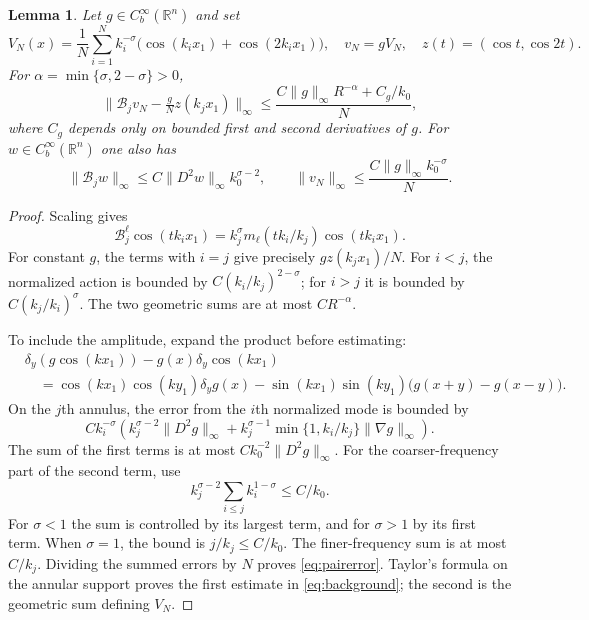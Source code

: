 \documentclass[11pt]{article}
\newcommand{\R}{\mathbb R}
\newcommand{\B}{\mathcal B}
\newcommand{\norm}[1]{\lVert#1\rVert}
\newcommand{\Cb}{C_b^\infty(\R^n)}
\newtheorem{lemma}[theorem]{Lemma}
\theoremstyle{remark}
\numberwithin{equation}{section}
\begin{document}
\begin{lemma}\label{lem:annular}
Let $g\in\Cb$ and set
\[
 V_N(x)=\frac1N\sum_{i=1}^N k_i^{-\sigma}
                  \bigl(\cos(k_ix_1)+\cos(2k_ix_1)\bigr),\quad
 v_N=gV_N,\quad z(t)=(\cos t,\cos 2t).
\]
For $\alpha=\min\{\sigma,2-\sigma\}>0$,
\begin{equation}\label{eq:pairerror}
 \norm{\B_jv_N-\tfrac gN z(k_jx_1)}_\infty
 \le \frac{C\norm g_\infty R^{-\alpha}+C_g/k_0}{N},
\end{equation}
where $C_g$ depends only on bounded first and second derivatives of $g$.
For $w\in\Cb$ one also has
\begin{equation}\label{eq:background}
 \norm{\B_jw}_\infty\le C\norm{D^2w}_\infty k_0^{\sigma-2},
 \qquad
 \norm{v_N}_\infty\le\frac{C\norm g_\infty k_0^{-\sigma}}{N}.
\end{equation}
\end{lemma}
\begin{proof}
Scaling gives
\[
 \B_j^\ell\cos(tk_ix_1)
   =k_j^\sigma m_\ell(tk_i/k_j)\cos(tk_ix_1).
\]
For constant $g$, the terms with $i=j$ give precisely $g z(k_jx_1)/N$.
For $i<j$, the normalized action is bounded by
$C(k_i/k_j)^{2-\sigma}$; for $i>j$ it is bounded by
$C(k_j/k_i)^\sigma$. The two geometric sums are at most $CR^{-\alpha}$.

To include the amplitude, expand the product before estimating:
\begin{align*}
 &\delta_y(g\cos(kx_1))-g(x)\delta_y\cos(kx_1)\\
 &\quad=\cos(kx_1)\cos(ky_1)\delta_yg(x)
 -\sin(kx_1)\sin(ky_1)\bigl(g(x+y)-g(x-y)\bigr).
\end{align*}
On the $j$th annulus, the error from the $i$th normalized mode is bounded by
\begin{equation}\label{eq:modsum}
 C k_i^{-\sigma}\left(
 k_j^{\sigma-2}\norm{D^2g}_\infty
 +k_j^{\sigma-1}\min\{1,k_i/k_j\}\norm{\nabla g}_\infty\right).
\end{equation}
The sum of the first terms is at most $Ck_0^{-2}\norm{D^2g}_\infty$.
For the coarser-frequency part of the second term, use
\[
 k_j^{\sigma-2}\sum_{i\le j}k_i^{1-\sigma}\le C/k_0.
\]
For $\sigma<1$ the sum is controlled by its largest term, and for
$\sigma>1$ by its first term. When $\sigma=1$, the bound is
$j/k_j\le C/k_0$. The finer-frequency sum is at most $C/k_j$.
Dividing the summed errors by $N$ proves \eqref{eq:pairerror}.
Taylor's formula on the annular support proves the first estimate in
\eqref{eq:background}; the second is the geometric sum defining $V_N$.
\end{proof}
\end{document}
